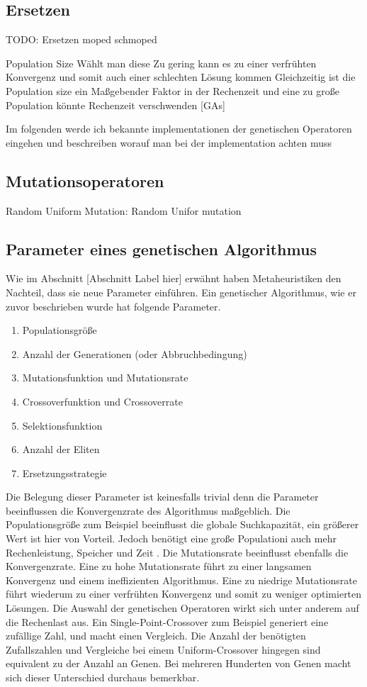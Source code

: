 \subsection{Ersetzen}
TODO: Ersetzen moped schmoped


Population Size
Wählt man diese Zu gering kann es zu einer verfrühten Konvergenz und somit auch einer schlechten Lösung kommen
Gleichzeitig ist die Population size ein Maßgebender Faktor in der Rechenzeit und eine zu große Population könnte 
Rechenzeit verschwenden [GAs]


Im folgenden werde ich bekannte implementationen der genetischen Operatoren eingehen und beschreiben worauf man bei der implementation achten muss

\subsection*{Mutationsoperatoren}
Random Uniform Mutation:
Random Unifor mutation 


\subsection*{Parameter eines genetischen Algorithmus}
Wie im Abschnitt [Abschnitt Label hier] erwähnt haben Metaheuristiken den Nachteil, dass sie neue Parameter einführen. Ein genetischer Algorithmus, wie er zuvor beschrieben wurde hat folgende Parameter.
\begin{enumerate}
    \item Populationsgröße
    \item Anzahl der Generationen (oder Abbruchbedingung)
    \item Mutationsfunktion und Mutationsrate
    \item Crossoverfunktion und Crossoverrate
    \item Selektionsfunktion
    \item Anzahl der Eliten
    \item Ersetzungsstrategie
\end{enumerate}
Die Belegung dieser Parameter ist keinesfalls trivial denn die Parameter beeinflussen die Konvergenzrate des Algorithmus maßgeblich. Die Populationsgröße zum Beispiel beeinflusst die globale Suchkapazität, ein größerer Wert ist hier von Vorteil. Jedoch benötigt eine große Populationi auch mehr Rechenleistung, Speicher und Zeit \cite*{TerminologiesAndOperators}. Die Mutationsrate beeinflusst ebenfalls die Konvergenzrate. Eine zu hohe Mutationsrate führt zu einer langsamen Konvergenz und einem ineffizienten Algorithmus. Eine zu niedrige Mutationsrate führt wiederum zu einer verfrühten Konvergenz und somit zu weniger optimierten Lösungen. Die Auswahl der genetischen Operatoren wirkt sich unter anderem auf die Rechenlast aus. Ein Single-Point-Crossover zum Beispiel generiert eine zufällige Zahl, und macht einen Vergleich. Die Anzahl der benötigten Zufallszahlen und Vergleiche bei einem Uniform-Crossover hingegen sind equivalent zu der Anzahl an Genen. Bei mehreren Hunderten von Genen macht sich dieser Unterschied durchaus bemerkbar.